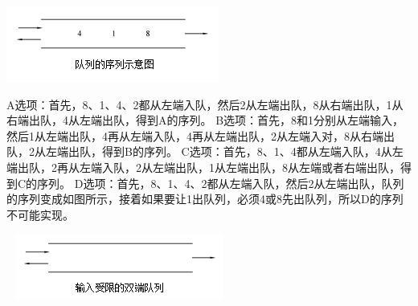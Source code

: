 \includegraphics[width=2.75000in,height=0.97917in]{computerassets/95a34a22ed1cd42d10a23b488d7f98e8.png}
\par{}
\begin{solution}A选项：首先，8、1、4、2都从左端入队，然后2从左端出队，8从右端出队，1从右端出队，4从左端出队，得到A的序列。
B选项：首先，8和1分别从左端输入，然后1从左端出队，4再从左端入队，4再从左端出队，2从左端入对，8从右端出队，2从左端出队，得到B的序列。
C选项：首先，8、1、4都从左端入队，4从左端出队，2再从左端入队，2从左端出队，1从左端出队，8从左端或者右端出队，得到C的序列。
D选项：首先，8、1、4、2都从左端入队，然后2从左端出队，队列的序列变成如图所示，接着如果要让1出队列，必须4或8先出队列，所以D的序列不可能实现。

~
\includegraphics[width=2.67708in,height=0.85417in]{computerassets/5165378b619f5b040e98b8bafb986fda.png}
\end{solution}
